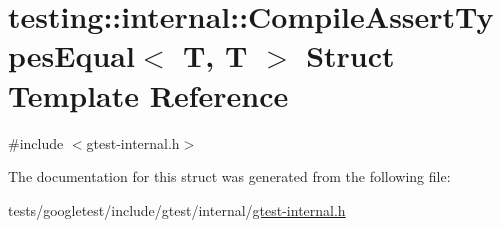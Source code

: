 \hypertarget{structtesting_1_1internal_1_1CompileAssertTypesEqual_3_01T_00_01T_01_4}{}\section{testing\+:\+:internal\+:\+:Compile\+Assert\+Types\+Equal$<$ T, T $>$ Struct Template Reference}
\label{structtesting_1_1internal_1_1CompileAssertTypesEqual_3_01T_00_01T_01_4}


{\ttfamily \#include $<$gtest-\/internal.\+h$>$}



The documentation for this struct was generated from the following file\+:\begin{DoxyCompactItemize}
\item 
tests/googletest/include/gtest/internal/\hyperlink{gtest-internal_8h}{gtest-\/internal.\+h}\end{DoxyCompactItemize}
